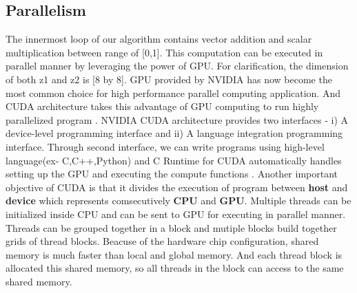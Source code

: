 \documentclass[11pt]{article}       %
\begin{document}
\subsection{Parallelism} \label{partech}
The innermost loop of our algorithm contains vector addition and scalar multiplication between range of [0,1]. This computation can be executed in parallel manner by leveraging the power of GPU. For clarification, the dimension of both z1 and z2 is [8 by 8]. GPU provided by NVIDIA has now become the most common choice for high performance parallel computing application. And CUDA architecture takes this advantage of GPU computing to run highly parallelized program  \cite{mis3}.  
NVIDIA CUDA architecture provides  two interfaces - i) A device-level programming interface and ii) A language integration programming interface. Through second interface, we can write programs using high-level language(ex- C,C++,Python) and C Runtime for CUDA automatically handles setting up the GPU and executing the compute functions \cite{mis3}. Another important objective of CUDA is that it divides the execution of program between \textbf{host} and \textbf{device} which represents comsecutively \textbf{CPU} and \textbf{GPU}. Multiple threads can be initialized inside CPU and can be sent to GPU for executing in parallel manner. Threads can be grouped together in a block and mutiple blocks build together grids of thread blocks. Beacuse of the hardware chip configuration, shared memory is much faster than local and global memory. And each thread block is allocated this shared memory, so all threads in the block can access to the same shared memory. 
\end{document}
